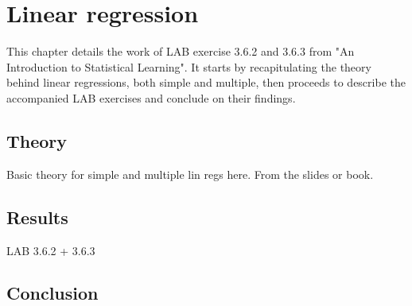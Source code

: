 \chapter{Linear regression} \label{ch:lineaerregression}

This chapter details the work of LAB exercise 3.6.2 and 3.6.3 from "An Introduction to Statistical Learning". It starts by recapitulating the theory behind linear regressions, both simple and multiple, then proceeds to describe the accompanied LAB exercises and conclude on their findings.

\section{Theory}

Basic theory for simple and multiple lin regs here. From the slides or book.

\section{Results}

LAB 3.6.2 + 3.6.3

\section{Conclusion}